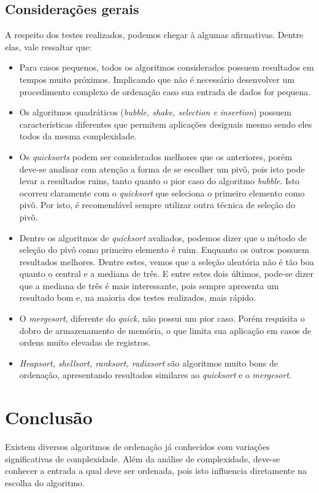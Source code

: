 \documentclass[
	11pt,
	oneside,
	a4paper,
	english,
	brazil,
	]{article}
\begin{document}
\subsection{Considerações gerais}
A respeito dos testes realizados, podemos chegar à algumas afirmativas. Dentre
elas, vale ressaltar que:

\begin{itemize}
 \item Para casos pequenos, todos os algoritmos considerados possuem resultados
 em tempos muito próximos. Implicando que não é necessário desenvolver um
 procedimento complexo de ordenação caso sua entrada de dados for pequena.
 \item Os algoritmos quadráticos (\textit{bubble, shake, selection e insertion})
 possuem características diferentes que permitem aplicações desiguais mesmo
 sendo eles todos da mesma complexidade.
 \item Os \textit{quicksorts} podem ser considerados melhores que os anteriores,
 porém deve-se analisar com atenção a forma de se escolher um pivô, pois isto
 pode levar a resultados ruins, tanto quanto o pior caso do algoritmo
 \textit{bubble}. Isto ocorreu claramente com o \textit{quicksort} que seleciona
 o primeiro elemento como pivô. Por isto, é recomendável sempre utilizar outra
 técnica de seleção do pivô.
 \item Dentre os algoritmos de \textit{quicksort} avaliados, podemos dizer que
 o método de seleção do pivô como primeiro elemento é ruim. Enquanto os outros
 possuem resultados melhores. Dentre estes, vemos que a seleção aleatória não é
 tão boa quanto o central e a mediana de três. E entre estes dois últimos,
 pode-se dizer que a mediana de três é mais interessante, pois sempre apresenta
 um resultado bom e, na maioria dos testes realizados, mais rápido.
 \item O \textit{mergesort}, diferente do \textit{quick}, não possui um pior
 caso. Porém requisita o dobro de armazenamento de memória, o que limita sua
 aplicação em casos de ordens muito elevadas de registros.
 \item \textit{Heapsort, shellsort, ranksort, radixsort} são algoritmos muito
 bons de ordenação, apresentando resultados similares ao \textit{quicksort} e o
 \textit{mergesort}.
\end{itemize}

\section{Conclusão}
Existem diversos algoritmos de ordenação já conhecidos com variações
significativas de complexidade. Além da análise de complexidade, deve-se
conhecer a entrada a qual deve ser ordenada, pois isto influencia diretamente
na escolha do algoritmo.
\end{document}
